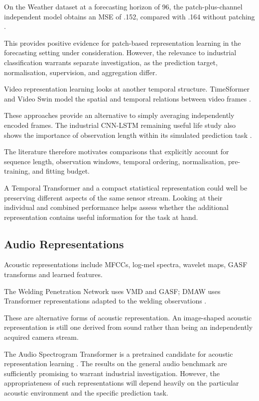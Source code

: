 On the Weather dataset at a forecasting horizon of 96, the patch-plus-channel independent model
obtains an MSE of .152, compared with .164 without patching \parencite[Table~7]{nie_time_2023}.

This provides positive evidence for patch-based representation learning in the forecasting setting
under consideration. However, the relevance to industrial classification warrants separate
investigation, as the prediction target, normalisation, supervision, and aggregation differ.

Video representation learning looks at another temporal structure. TimeSformer and Video Swin model
the spatial and temporal relations between video frames \parencite{bertasius_is_2021,liu_video_2021}.

These approaches provide an alternative to simply averaging independently encoded frames. The
industrial CNN-LSTM remaining useful life study also shows the importance of observation length
within its simulated prediction task \parencite{al-dulaimi_multimodal_2019}.

The literature therefore motivates comparisons that explicitly account for sequence length,
observation windows, temporal ordering, normalisation, pre-training, and fitting budget.

A Temporal Transformer and a compact statistical representation could well be preserving different
aspects of the same sensor stream. Looking at their individual and combined performance helps assess
whether the additional representation contains useful information for the task at hand.

\subsection{Audio Representations}

Acoustic representations include MFCCs, log-mel spectra, wavelet maps, GASF transforms and learned
features.

The Welding Penetration Network uses VMD and GASF; DMAW uses Transformer representations adapted to
the welding observations \parencite{hua_anti-interference_2026,fan_dmaw_2026}.

These are alternative forms of acoustic representation. An image-shaped acoustic representation is
still one derived from sound rather than being an independently acquired camera stream.

The Audio Spectrogram Transformer is a pretrained candidate for acoustic representation learning
\parencite{gong_ast_2021}. The results on the general audio benchmark are sufficiently promising to warrant
industrial investigation. However, the appropriateness of such representations will depend heavily
on the particular acoustic environment and the specific prediction task.

